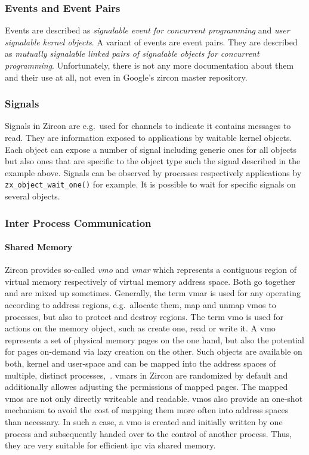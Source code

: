 \subsubsection*{Events and Event Pairs}
Events are described as \textit{signalable event for concurrent programming}\cite{zircon-event} and \textit{user signalable kernel objects}\cite{zircon-event}.
A variant of events are event pairs.
They are described as \textit{mutually signalable linked pairs of signalable objects for concurrent programming}\cite{zircon-eventpair}.
Unfortunately, there is not any more documentation about them and their use at all, not even in Google's zircon master repository.

\subsubsection*{Signals}
Signals in Zircon are e.g.\ used for channels to indicate it contains messages to read.
They are information exposed to applications by waitable kernel objects.
Each object can expose a number of signal including generic ones for all objects but also ones that are specific to the object type such the signal described in the example above.
Signals can be observed by processes respectively applications by \texttt{zx\_object\_wait\_one()} for example.
It is possible to wait for specific signals on several objects\cite{zircon-signals}.

\subsubsection*{Inter Process Communication}
\paragraph{Shared Memory}
Zircon provides so-called \textit{\ac{vmo}} and \textit{\ac{vmar}} which represents a contiguous region of virtual memory respectively of virtual memory address space.
Both go together and are mixed up sometimes.
Generally, the term \ac{vmar} is used for any operating according to address regions, e.g.\ allocate them, map and unmap \acp{vmo} to processes, but also to protect and destroy regions\cite{zircon-vmar}.
The term \ac{vmo} is used for actions on the memory object, such as create one, read or write it\cite{zircon-vmo}.
A \ac{vmo} represents a set of physical memory pages on the one hand, but also the potential for pages on-demand via lazy creation on the other.
Such objects are available on both, kernel and user-space and can be mapped into the address spaces of multiple, distinct processes\cite{zircon-vmo},~\cite{zircon-concepts}.
\acp{vmar} in Zircon are randomized by default and additionally allowes adjusting the permissions of mapped pages\cite{zircon-vmar}.
The mapped \acp{vmo} are not only directly writeable and readable.
\acp{vmo} also provide an one-shot mechanism to avoid the cost of mapping them more often into address spaces than necessary.
In such a case, a \ac{vmo} is created and initially written by one process and subsequently handed over to the control of another process\cite{zircon-concepts}.
Thus, they are very suitable for efficient \ac{ipc} via shared memory.

